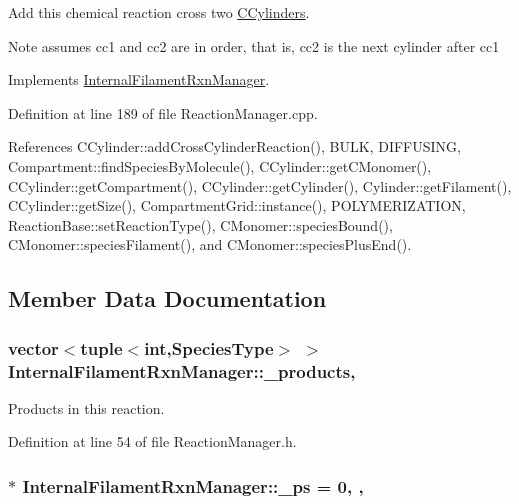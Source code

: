 Add this chemical reaction cross two \hyperlink{classCCylinder}{C\+Cylinders}. 

\begin{DoxyNote}{Note}
assumes cc1 and cc2 are in order, that is, cc2 is the next cylinder after cc1 
\end{DoxyNote}


Implements \hyperlink{classInternalFilamentRxnManager_ac8152bcd9f6aa5d69f85a98cff86d2b0}{Internal\+Filament\+Rxn\+Manager}.



Definition at line 189 of file Reaction\+Manager.\+cpp.



References C\+Cylinder\+::add\+Cross\+Cylinder\+Reaction(), B\+U\+L\+K, D\+I\+F\+F\+U\+S\+I\+N\+G, Compartment\+::find\+Species\+By\+Molecule(), C\+Cylinder\+::get\+C\+Monomer(), C\+Cylinder\+::get\+Compartment(), C\+Cylinder\+::get\+Cylinder(), Cylinder\+::get\+Filament(), C\+Cylinder\+::get\+Size(), Compartment\+Grid\+::instance(), P\+O\+L\+Y\+M\+E\+R\+I\+Z\+A\+T\+I\+O\+N, Reaction\+Base\+::set\+Reaction\+Type(), C\+Monomer\+::species\+Bound(), C\+Monomer\+::species\+Filament(), and C\+Monomer\+::species\+Plus\+End().



\subsection{Member Data Documentation}
\hypertarget{classInternalFilamentRxnManager_afd213da1a3706e2e88962e5da886a5dc}{
\subsubsection[{\+\_\+products}]{\setlength{\rightskip}{0pt plus 5cm}vector$<$tuple$<$int,{\bf Species\+Type}$>$ $>$ Internal\+Filament\+Rxn\+Manager\+::\+\_\+products\hspace{0.3cm}{\ttfamily [protected]}, {\ttfamily [inherited]}}}\label{classInternalFilamentRxnManager_afd213da1a3706e2e88962e5da886a5dc}


Products in this reaction. 



Definition at line 54 of file Reaction\+Manager.\+h.

\hypertarget{classInternalFilamentRxnManager_a973ce9cc2aae811e6867afa46193c5f2}{
\subsubsection[{\+\_\+ps}]{ $\ast$ Internal\+Filament\+Rxn\+Manager\+::\+\_\+ps = 0\hspace{0.3cm}{\ttfamily [static]}, {\ttfamily [protected]}, {\ttfamily [inherited]}}}\label{classInternalFilamentRxnManager_a973ce9cc2aae811e6867afa46193c5f2}


